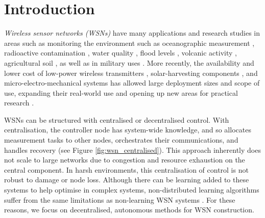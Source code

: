 \section{Introduction}

\ifdefined\DEBUG {} \else \fi
\textit{Wireless sensor networks (WSNs)} have many applications and research studies in areas such as monitoring the environment such as oceanographic measurement \citep{Mahdy2008a, Albaladejo2010, 6973877}, radioactive contamination \citep{Gomez2015}, water quality \citep{Fang2010}, flood levels \citep{Castillo-effen2004}, volcanic activity \citep{Werner-Allen2006}, agricultural soil \citep{8745854}, as well as in military uses \citep{6268958}. More recently, the availability and lower cost of low-power wireless transmitters \citep{902661}, solar-harvesting components \citep{Prauzek2018}, and micro-electro-mechanical systems \citep{1045391} has allowed large deployment sizes and scope of use, expanding their real-world use and opening up new areas for practical research \citep{5597912, Kandris2020}.

\ifdefined\DEBUG {} \else \fi
\ifdefined\DEBUG {} \else \fi
WSNs can be structured with centralised or decentralised control. With centralisation, the controller node has system-wide knowledge, and so allocates measurement tasks to other nodes, orchestrates their communications, and handles recovery (see Figure \ref{fig:wsn_centralised}). This approach inherently does not scale to large networks due to congestion and resource exhaustion on the central component. In harsh environments, this centralisation of control is not robust to damage or node loss. Although there can be learning added to these systems to help optimise in complex systems, non-distributed learning algorithms suffer from the same limitations as non-learning WSN systems \citep{Imagestate2006}. For these reasons, we focus on decentralised, autonomous methods for WSN construction.

